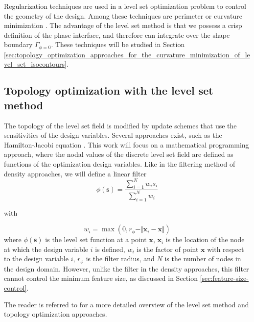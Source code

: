 Regularization techniques are used in a level set optimization problem to control the geometry of the design. Among these techniques are perimeter or curvature minimization \citep{MKM+:11,YIN+:10,DLK:12}. The advantage of the level set method is that we possess a crisp definition of the phase interface, and therefore can integrate over the shape boundary $\Gamma_{\phi=0}$. These techniques will be studied in Section \ref{sec:topology_optimization_approaches_for_the_curvature_minimization_of_level_set_isocontours}.


\subsection{Topology optimization with the level set method}

The topology of the level set field is modified by update schemes that use the sensitivities of the design variables. Several approaches exist, such as the Hamilton-Jacobi equation \citep{YNY+:10}. This work will focus on a mathematical programming approach, where the nodal values of the discrete level set field are defined as functions of the optimization design variables. Like in the filtering method of density approaches, we will define a linear filter
%
\begin{equation}
	\label{eq:smoothing_filter_XFEM}
	\phi\left(\mathbf{s}\right)=\frac{\sum_{i=1}^{N}w_{i}s_{i}}{\sum_{i=1}^{N}w_{i}}
\end{equation}

with

\begin{equation}
	\label{eq:weight_XFEM}
	w_{i}=\max \left( 0, r_{\phi} - \Vert \mathbf{x}_i - \mathbf{x} \Vert \right)
\end{equation}
%
where $\phi\left(\mathbf{s}\right)$ is the level set function at a point $\mathbf{x}$, $\mathbf{x}_{i}$ is the location of the node at which the design variable $i$ is defined, $w_{i}$ is the factor of point $\mathbf{x}$ with respect to the design variable $i$, $r_{\phi}$ is the filter radius, and $N$ is the number of nodes in the design domain. However, unlike the filter in the density approaches, this filter cannot control the minimum feature size, as discussed in Section \ref{sec:feature-size-control}.

The reader is referred to \citep{DML+:13,GP:13} for a more detailed overview of the level set method and topology optimization approaches.

